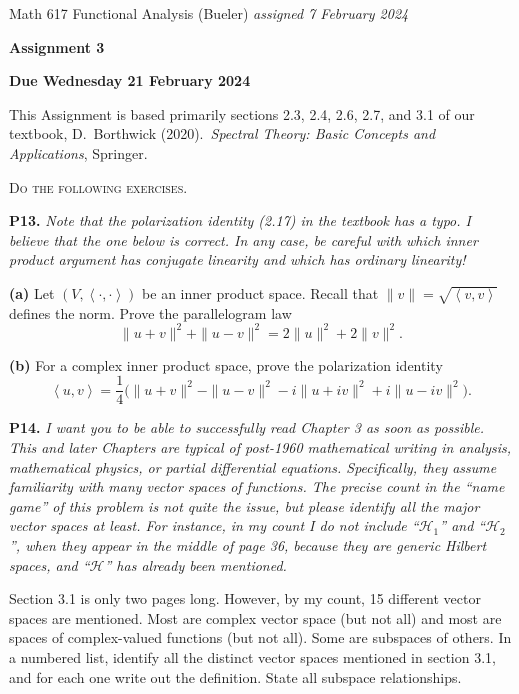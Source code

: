 \documentclass[12pt]{amsart}
\newcommand{\cH}{\mathcal{H}}
\newcommand{\ip}[2]{\ensuremath{\left<#1,#2\right>}}
\newcommand{\prob}[1]{\bigskip\noindent\textbf{#1.}\quad }
\newcommand{\epart}[1]{\medskip\noindent\textbf{(#1)}\quad }
\begin{document}
\scriptsize \noindent Math 617 Functional Analysis (Bueler) \hfill \emph{assigned 7 February 2024}
\normalsize\medskip

\Large\centerline{\textbf{Assignment 3}}
\large
\medskip

\centerline{\textbf{Due Wednesday 21 February 2024}}
\medskip
\normalsize

\thispagestyle{empty}

\bigskip
\noindent This Assignment is based primarily sections 2.3, 2.4, 2.6, 2.7, and 3.1 of our textbook, D.~Borthwick (2020).~\emph{Spectral Theory: Basic Concepts and Applications}, Springer.

\medskip
\noindent \textsc{Do the following exercises.}
\smallskip

\prob{P13}  \emph{Note that the polarization identity (2.17) in the textbook has a typo.  I believe that the one below is correct.  In any case, be careful with which inner product argument has conjugate linearity and which has ordinary linearity!}

\epart{a} Let $(V,\ip{\cdot}{\cdot})$ be an inner product space.  Recall that $\|v\|=\sqrt{\ip{v}{v}}$ defines the norm.  Prove the parallelogram law
    $$\|u+v\|^2 + \|u-v\|^2 = 2 \|u\|^2 + 2 \|v\|^2.$$

\epart{b} For a complex inner product space, prove the polarization identity
    $$\ip{u}{v} = \frac{1}{4} \Big(\|u+v\|^2 - \|u-v\|^2 - i\|u+iv\|^2 + i\|u-iv\|^2\Big).$$


\prob{P14}  \emph{I want you to be able to successfully \emph{read} Chapter 3 as soon as possible.  This and later Chapters are typical of post-1960 mathematical writing in analysis, mathematical physics, or partial differential equations.  Specifically, they assume familiarity with many vector spaces of functions. The precise count in the ``name game'' of this problem is not quite the issue, but please identify all the major vector spaces at least.  For instance, in my count I do not include ``$\cH_1$'' and ``$\cH_2$'', when they appear in the middle of page 36,  because they are generic Hilbert spaces, and ``$\cH$'' has already been mentioned.}

\medskip
\noindent
Section 3.1 is only two pages long.  However, by my count, 15 different vector spaces are mentioned.  Most are complex vector space (but not all) and most are spaces of complex-valued functions (but not all).  Some are subspaces of others.  In a numbered list, identify all the distinct vector spaces mentioned in section 3.1, and for each one write out the definition.  State all subspace relationships.
\end{document}
